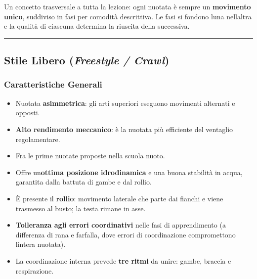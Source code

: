 \documentclass[a4paper,11pt]{article}
\providecommand{\tightlist}{%
  \setlength{\itemsep}{0pt}\setlength{\parskip}{0pt}}
\begin{document}
Un concetto trasversale a tutta la lezione: ogni nuotata è sempre un
\textbf{movimento unico}, suddiviso in fasi per comodità descrittiva. Le
fasi si fondono l\textquotesingle una nell\textquotesingle altra e la
qualità di ciascuna determina la riuscita della successiva.

\begin{center}\rule{0.5\linewidth}{0.5pt}\end{center}

\subsection{\texorpdfstring{Stile Libero (\emph{Freestyle /
                  Crawl})}{Stile Libero (Freestyle / Crawl)}}\label{stile-libero-freestyle-crawl}

\subsubsection{Caratteristiche Generali}\label{caratteristiche-generali}

\begin{itemize}
      \tightlist
      \item
            Nuotata \textbf{asimmetrica}: gli arti superiori eseguono movimenti
            alternati e opposti.
      \item
            \textbf{Alto rendimento meccanico}: è la nuotata più efficiente del
            ventaglio regolamentare.
      \item
            Fra le prime nuotate proposte nella scuola nuoto.
      \item
            Offre un\textquotesingle{}\textbf{ottima posizione idrodinamica} e una
            buona stabilità in acqua, garantita dalla battuta di gambe e dal
            rollio.
      \item
            È presente il \textbf{rollio}: movimento laterale che parte dai
            fianchi e viene trasmesso al busto; la testa rimane in asse.
      \item
            \textbf{Tolleranza agli errori coordinativi} nelle fasi di
            apprendimento (a differenza di rana e farfalla, dove errori di
            coordinazione compromettono l\textquotesingle intera nuotata).
      \item
            La coordinazione interna prevede \textbf{tre ritmi} da unire: gambe,
            braccia e respirazione.
\end{itemize}
\end{document}
